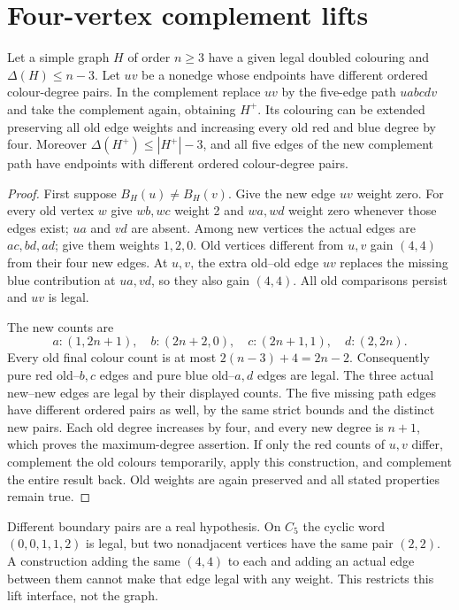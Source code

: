 \section{Four-vertex complement lifts}\label{sec:complements}

\begin{theorem}\label{thm:complementlift}
Let a simple graph $H$ of order $n\ge3$ have a given legal doubled
colouring and $\Delta(H)\le n-3$. Let $uv$ be a nonedge whose
endpoints have different ordered colour-degree pairs. In the
complement replace $uv$ by the five-edge path $uabcdv$ and take
the complement again, obtaining $H^+$. Its colouring can be extended
preserving all old edge weights and increasing every old red and
blue degree by four. Moreover $\Delta(H^+)\le |H^+|-3$, and
all five edges of the new complement path have endpoints with
different ordered colour-degree pairs.
\end{theorem}
\begin{proof}
First suppose $B_H(u)\ne B_H(v)$. Give the new edge $uv$ weight
zero. For every old vertex $w$ give $wb,wc$ weight 2 and $wa,wd$
weight zero whenever those edges exist; $ua$ and $vd$ are absent.
Among new vertices the actual edges are $ac,bd,ad$; give them
weights $1,2,0$. Old vertices different from $u,v$ gain $(4,4)$
from their four new edges. At $u,v$, the extra old--old edge $uv$
replaces the missing blue contribution at $ua,vd$, so they also
gain $(4,4)$. All old comparisons persist and $uv$ is legal.

The new counts are
\[
 a:(1,2n+1),\quad b:(2n+2,0),\quad
 c:(2n+1,1),\quad d:(2,2n).
\]
Every old final colour count is at most $2(n-3)+4=2n-2$.
Consequently pure red old--$b,c$ edges and pure blue old--$a,d$
edges are legal. The three actual new--new edges are legal by their
displayed counts. The five missing path edges have different ordered
pairs as well, by the same strict bounds and the distinct new pairs.
Each old degree increases by four, and every new degree is $n+1$,
which proves the maximum-degree assertion. If only the red counts
of $u,v$ differ, complement the old colours temporarily, apply this
construction, and complement the entire result back. Old weights
are again preserved and all stated properties remain true.
\end{proof}

Different boundary pairs are a real hypothesis. On $C_5$ the cyclic
word $(0,0,1,1,2)$ is legal, but two nonadjacent vertices have the
same pair $(2,2)$. A construction adding the same $(4,4)$ to each
and adding an actual edge between them cannot make that edge legal
with any weight. This restricts this lift interface, not the graph.

